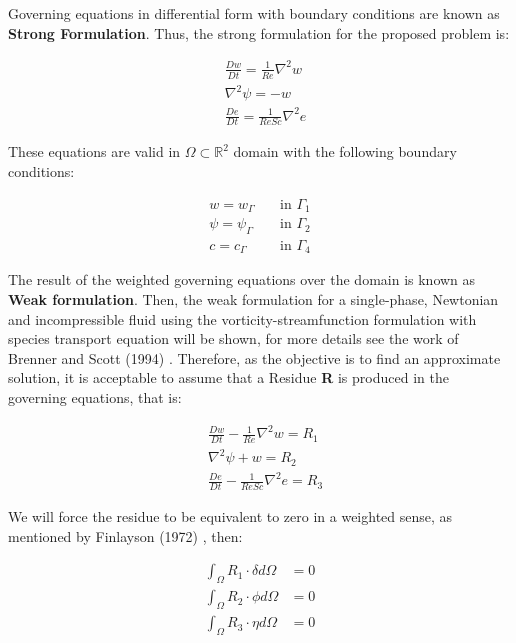 Governing equations in differential form 
with boundary conditions are known as \textbf{Strong Formulation}. 
Thus, the strong formulation for the proposed problem is:

\begin{align}
& \frac{D w}{D t}
 =
 \frac{1}{Re} \nabla^{2} w
 \\[10pt] 
& \nabla^{2} \psi
 = 
 - 
 w \\[10pt]
& \frac{D e}{Dt}
 =
 \frac{1}{ReSc} \nabla^{2} e
\end{align}


\medskip
\noindent
These equations are valid in 
$\Omega \subset \mathbb{R}^2$ domain
with the following boundary conditions:

\begin{equation} \label{bc}
 \begin{aligned}
  w = w_\Gamma \quad & \mbox{in $\Gamma_1$}\\
  \psi = \psi_\Gamma \quad & \mbox{in $\Gamma_2$}\\
  c = c_\Gamma \quad & \mbox{in $\Gamma_4$}
\end{aligned}
\end{equation}

\medskip
The result of the weighted governing equations over the domain 
is known as \textbf{Weak formulation}.
Then, the weak formulation 
for a single-phase, Newtonian and incompressible fluid using 
the vorticity-streamfunction formulation with species transport equation
will be shown, for more details see the work of Brenner and Scott (1994) 
\cite{brenner1994}. 
Therefore, as the objective is to find an approximate solution, 
it is acceptable to assume that a Residue \textbf{R} 
is produced in the governing equations, that is:


\begin{align}
& \frac{D w}{D t}
 -
 \frac{1}{Re} \nabla^{2} w
 = R_1 \\[10pt] 
& \nabla^{2} \psi
 + 
 w 
 = R_2 \\[10pt]
& \frac{D e}{Dt}
 -
 \frac{1}{ReSc} \nabla^{2} e
 = R_3
\end{align}

\medskip
We will force the residue to be equivalent to zero 
in a weighted sense, as mentioned by Finlayson (1972) \cite{finlayson1972}, then:

\begin{align}
 \int_{\Omega} R_1 \cdot \delta d\Omega &= 0 \\
 \int_{\Omega} R_2 \cdot \phi d\Omega &= 0 \\
 \int_{\Omega} R_3 \cdot \eta d\Omega &= 0
\end{align}



